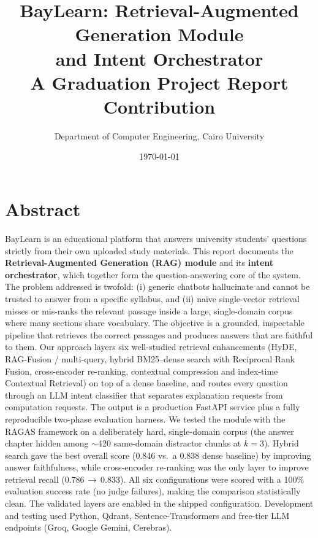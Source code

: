 \documentclass[12pt,a4paper]{report}
\title{\textbf{BayLearn: Retrieval-Augmented Generation Module\\and Intent Orchestrator}\\[0.5em]\large A Graduation Project Report Contribution}
\author{Department of Computer Engineering, Cairo University}
\date{\today}
\begin{document}
\maketitle

\chapter*{Abstract}
BayLearn is an educational platform that answers university students' questions
strictly from their own uploaded study materials. This report documents the
\textbf{Retrieval-Augmented Generation (RAG) module} and its \textbf{intent
orchestrator}, which together form the question-answering core of the system.
The problem addressed is twofold: (i) generic chatbots hallucinate and cannot be
trusted to answer from a specific syllabus, and (ii) na\"ive single-vector
retrieval misses or mis-ranks the relevant passage inside a large, single-domain
corpus where many sections share vocabulary. The objective is a grounded,
inspectable pipeline that retrieves the correct passages and produces answers
that are faithful to them. Our approach layers six well-studied retrieval
enhancements (HyDE, RAG-Fusion / multi-query, hybrid BM25--dense search with
Reciprocal Rank Fusion, cross-encoder re-ranking, contextual compression and
index-time Contextual Retrieval) on top of a dense baseline, and routes every
question through an LLM intent classifier that separates explanation requests
from computation requests. The output is a production FastAPI service plus a
fully reproducible two-phase evaluation harness. We tested the module with the
RAGAS framework on a deliberately hard, single-domain corpus (the answer chapter
hidden among $\sim$420 same-domain distractor chunks at $k=3$). Hybrid search
gave the best overall score (0.846 vs.\ a 0.838 dense baseline) by improving
answer faithfulness, while cross-encoder re-ranking was the only layer to improve
retrieval recall (0.786\,$\rightarrow$\,0.833). All six configurations were
scored with a 100\% evaluation success rate (no judge failures), making the
comparison statistically clean. The validated layers are enabled in the shipped
configuration. Development and testing used Python, Qdrant, Sentence-Transformers
and free-tier LLM endpoints (Groq, Google Gemini, Cerebras).

\end{document}
